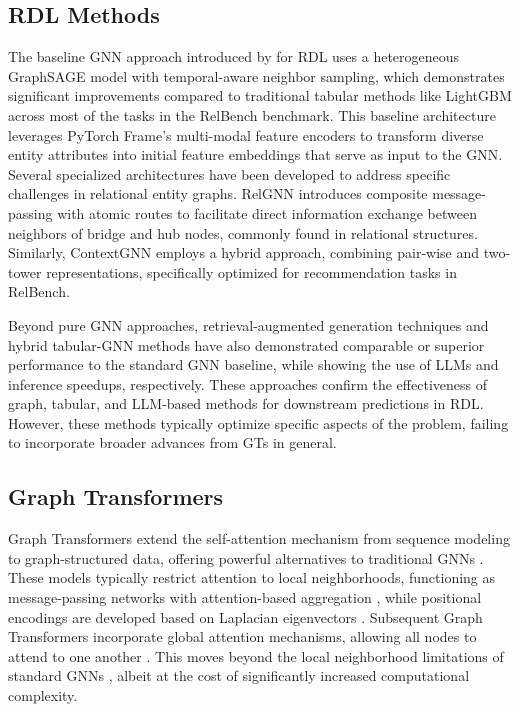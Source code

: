 \documentclass{article} %
\begin{document}
\subsection{RDL Methods}
The baseline GNN approach introduced by \citep{robinson2025relbench} for RDL uses a heterogeneous GraphSAGE \citep{hamilton2017inductive} model with temporal-aware neighbor sampling, which demonstrates significant improvements compared to traditional tabular methods like LightGBM \citep{ke2017lightgbm} across most of the tasks in the RelBench benchmark. This baseline architecture leverages PyTorch Frame's multi-modal feature encoders \citep{hu2024pytorch} to transform diverse entity attributes into initial feature embeddings that serve as input to the GNN. %
Several specialized architectures have been developed to address specific challenges in relational entity graphs. RelGNN \citep{chen2025relgnn} introduces composite message-passing with atomic routes to facilitate direct information exchange between neighbors of bridge and hub nodes, commonly found in relational structures. 
Similarly, ContextGNN \citep{yuan2024contextgnn} employs a hybrid approach, combining pair-wise and two-tower representations, specifically optimized for recommendation tasks in RelBench. 

Beyond pure GNN approaches, retrieval-augmented generation techniques \citep{wydmuch2024tackling} and hybrid tabular-GNN methods \citep{lachiover} have also demonstrated comparable or 
superior performance to the standard GNN baseline, while showing the use of LLMs \citep{grattafiori2024llama} and inference speedups, respectively. 
These approaches confirm the effectiveness of graph, tabular, and LLM-based methods for downstream predictions in RDL. However, these methods typically optimize specific aspects of the problem, failing to incorporate broader advances from GTs in general. %


\subsection{Graph Transformers}
Graph Transformers extend the self-attention mechanism from sequence modeling \citep{vaswani2017attention} to graph-structured data, offering powerful alternatives to traditional GNNs
\citep{dwivedi2021generalization}. These models typically restrict attention to local neighborhoods, functioning as message-passing networks with attention-based aggregation \citep{joshi2020transformers, bronstein2021geometric}, while positional encodings are developed based on Laplacian eigenvectors \citep{dwivedi2020benchmarking}. Subsequent Graph Transformers incorporate global attention mechanisms, allowing all nodes to attend to one another \citep{ying2021transformers, mialon2021graphit, kreuzer2021rethinking}. This moves beyond the local neighborhood limitations of standard GNNs \citep{alon2020bottleneck}, albeit at the cost of significantly increased computational complexity.
\end{document}
